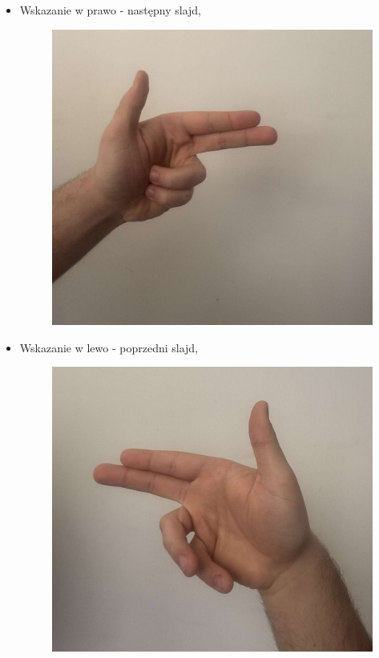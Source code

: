 \documentclass[12pt,a4paper]{article}
\begin{document}
\begin{itemize}
    \item Wskazanie w prawo - następny slajd,
    \begin{figure}[H]
      \includegraphics[width=\textwidth]{images/prawo.jpg}
    \end{figure}
    \item Wskazanie w lewo - poprzedni slajd,
    \begin{figure}[H]
      \includegraphics[width=\textwidth]{images/lewo.jpg}

\end{figure}
\end{itemize}
\end{document}
